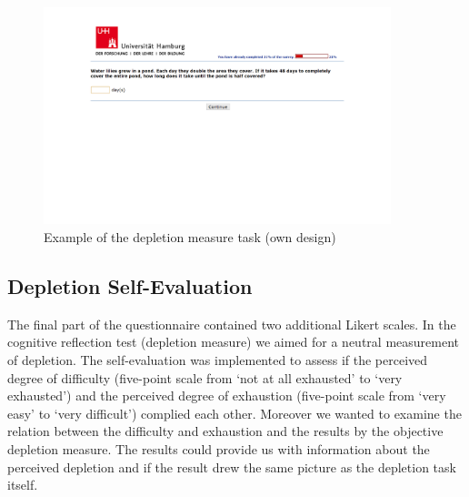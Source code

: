 \begin{figure}[h!]
\center
	\includegraphics[trim = 8cm 18cm 8cm 2cm,clip=true,width=0.9\textwidth]{images/os_depletion_measure.png}
  \caption{Example of the depletion measure task (own design)}\label{fig:os_depletion_measure}
\end{figure}

\FloatBarrier

\subsection{Depletion Self-Evaluation}\label{sec:depletion_self_evaluation}
The final part of the questionnaire contained two additional Likert scales. In the cognitive reflection test (depletion measure) we aimed for a neutral measurement of depletion. The self-evaluation was implemented to assess if the perceived degree of difficulty (five-point scale from ‘not at all exhausted’ to ‘very exhausted’) and the perceived degree of exhaustion (five-point scale from ‘very easy’ to ‘very difficult’) complied each other. Moreover we wanted to examine the relation between the difficulty and exhaustion and the results by the objective depletion measure. The results could provide us with information about the perceived depletion and if the result drew the same picture as the depletion task itself. 

\FloatBarrier

